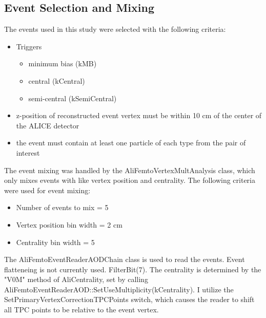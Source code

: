 \subsection{Event Selection and Mixing}
\label{EventSelection}

The events used in this study were selected with the following criteria:

\begin{itemize}
 \item Triggers
 \begin{itemize}
  \item minimum bias (kMB)
  \item central (kCentral)
  \item semi-central (kSemiCentral)
 \end{itemize}
 \item z-position of reconstructed event vertex must be within 10 cm of the center of the ALICE detector
 \item the event must contain at least one particle of each type from the pair of interest
\end{itemize}

The event mixing was handled by the AliFemtoVertexMultAnalysis class, which only mixes events with like vertex position and centrality.
The following criteria were used for event mixing:

\begin{itemize}
 \item Number of events to mix = 5
 \item Vertex position bin width = 2 cm
 \item Centrality bin width = 5%
\end{itemize}

The AliFemtoEventReaderAODChain class is used to read the events.
Event flatteneing is not currently used.
FilterBit(7).
The centrality is determined by the "V0M" method of AliCentrality, set by calling AliFemtoEventReaderAOD::SetUseMultiplicity(kCentrality).
I utilize the SetPrimaryVertexCorrectionTPCPoints switch, which causes the reader to shift all TPC points to be relative to the event vertex.